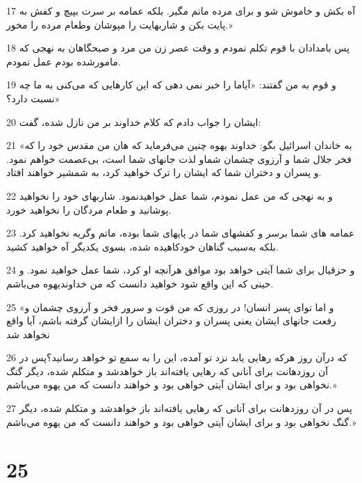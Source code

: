 \par 17 آه بکش و خاموش شو و برای مرده ماتم مگیر. بلکه عمامه بر سرت بپیچ و کفش به پایت بکن و شاربهایت را مپوشان وطعام مرده را مخور.»
\par 18 پس بامدادان با قوم تکلم نمودم و وقت عصر زن من مرد و صبحگاهان به نهجی که مامورشده بودم عمل نمودم.
\par 19 و قوم به من گفتند: «آیاما را خبر نمی دهی که این کارهایی که می‌کنی به ما چه نسبت دارد؟»
\par 20 ایشان را جواب دادم که کلام خداوند بر من نازل شده، گفت:
\par 21 «به خاندان اسرائیل بگو: خداوند یهوه چنین می‌فرماید که هان من مقدس خود را که فخر جلال شما و آرزوی چشمان شماو لذت جانهای شما است، بی‌عصمت خواهم نمود. و پسران و دختران شما که ایشان را ترک خواهید کرد، به شمشیر خواهند افتاد.
\par 22 و به نهجی که من عمل نمودم، شما عمل خواهیدنمود. شاربهای خود را نخواهید پوشانید و طعام مردگان را نخواهید خورد.
\par 23 عمامه های شما برسر و کفشهای شما در پایهای شما بوده، ماتم وگریه نخواهید کرد. بلکه به‌سبب گناهان خودکاهیده شده، بسوی یکدیگر آه خواهید کشید.
\par 24 و حزقیال برای شما آیتی خواهد بود موافق هر‌آنچه او کرد، شما عمل خواهید نمود. و حینی که این واقع شود خواهید دانست که من خداوندیهوه می‌باشم.
\par 25 «و اما تو‌ای پسر انسان! در روزی که من قوت و سرور فخر و آرزوی چشمان و رفعت جانهای ایشان یعنی پسران و دختران ایشان را ازایشان گرفته باشم، آیا واقع نخواهد شد
\par 26 که درآن روز هر‌که رهایی یابد نزد تو آمده، این را به سمع تو خواهد رسانید؟پس در آن روزدهانت برای آنانی که رهایی یافته‌اند باز خواهدشد و متکلم شده، دیگر گنگ نخواهی بود و برای ایشان آیتی خواهی بود و خواهند دانست که من یهوه می‌باشم.»
\par 27 پس در آن روزدهانت برای آنانی که رهایی یافته‌اند باز خواهدشد و متکلم شده، دیگر گنگ نخواهی بود و برای ایشان آیتی خواهی بود و خواهند دانست که من یهوه می‌باشم.»

\chapter{25}

